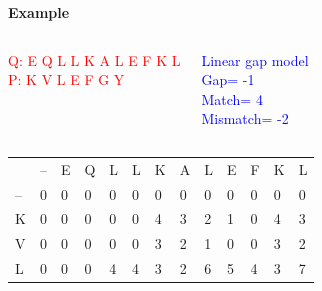 \documentclass{bredelebeamer}
\begin{document}
 \begin{frame}
  \centering
  \begin{Large}
   \textbf{Example} \linebreak
  \end{Large}
\begin{columns}
\textcolor{red}{Q:  E Q L L K A L E F K L \\
P:  K V L E F G Y}

\textcolor{blue}{Linear gap model \\
Gap= -1 \\
Match= 4 \\
Mismatch= -2}

\end{columns}
     \begin{table}[]
\centering
\begin{tabular}{lllllllllllll}
                        & --                     & E                      & Q                      & L                      & L                      & K                      & A                      & L                      & E                       & F                       & K                       & L                       \\ \cline{2-13} 
\multicolumn{1}{l|}{--} & \multicolumn{1}{l|}{0} & \multicolumn{1}{l|}{0} & \multicolumn{1}{l|}{0} & \multicolumn{1}{l|}{0} & \multicolumn{1}{l|}{0} & \multicolumn{1}{l|}{0} & \multicolumn{1}{l|}{0} & \multicolumn{1}{l|}{0} & \multicolumn{1}{l|}{0}  & \multicolumn{1}{l|}{0}  & \multicolumn{1}{l|}{0}  & \multicolumn{1}{l|}{0}  \\ \cline{2-13} 
\multicolumn{1}{l|}{K}  & \multicolumn{1}{l|}{0} & \multicolumn{1}{l|}{0} & \multicolumn{1}{l|}{0} & \multicolumn{1}{l|}{0} & \multicolumn{1}{l|}{0} & \multicolumn{1}{l|}{4} & \multicolumn{1}{l|}{3} & \multicolumn{1}{l|}{2} & \multicolumn{1}{l|}{1}  & \multicolumn{1}{l|}{0}  & \multicolumn{1}{l|}{4}  & \multicolumn{1}{l|}{3}  \\ \cline{2-13} 
\multicolumn{1}{l|}{V}  & \multicolumn{1}{l|}{0} & \multicolumn{1}{l|}{0} & \multicolumn{1}{l|}{0} & \multicolumn{1}{l|}{0} & \multicolumn{1}{l|}{0} & \multicolumn{1}{l|}{3} & \multicolumn{1}{l|}{2} & \multicolumn{1}{l|}{1} & \multicolumn{1}{l|}{0}  & \multicolumn{1}{l|}{0}  & \multicolumn{1}{l|}{3}  & \multicolumn{1}{l|}{2}  \\ \cline{2-13} 
\multicolumn{1}{l|}{L}  & \multicolumn{1}{l|}{0} & \multicolumn{1}{l|}{0} & \multicolumn{1}{l|}{0} & \multicolumn{1}{l|}{4} & \multicolumn{1}{l|}{4} & \multicolumn{1}{l|}{3} & \multicolumn{1}{l|}{2} & \multicolumn{1}{l|}{6} & \multicolumn{1}{l|}{5}  & \multicolumn{1}{l|}{4}  & \multicolumn{1}{l|}{3}  & \multicolumn{1}{l|}{7}  \\ \cline{2-13} 

\end{tabular}
\end{table}
\end{frame}
\end{document}
